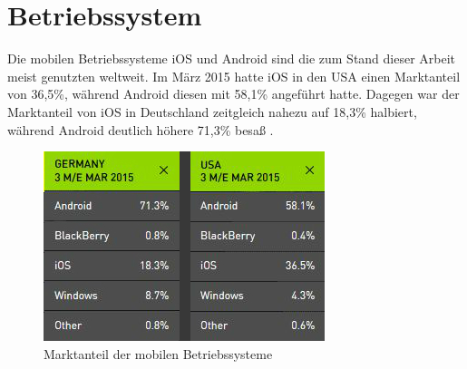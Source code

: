 \section{Betriebssystem}
	Die mobilen Betriebssysteme iOS und Android sind die zum Stand dieser Arbeit
	meist genutzten weltweit. Im März 2015 hatte iOS in den USA einen
	Marktanteil von 36,5\%, während Android diesen mit 58,1\% angeführt hatte.
	Dagegen war der Marktanteil von iOS in Deutschland zeitgleich nahezu auf 18,3\%
	halbiert, während Android deutlich höhere 71,3\% besaß \cite{MobileOsStat}.
	\begin{figure}[h]
		\centering
		\includegraphics[width=0.5\linewidth]{ios/media/marketshare-cmp-201503.jpg}
		\caption{Marktanteil der mobilen Betriebssysteme
		\cite{MobileOsStat}}
		\label{fig:marcetshare}
	\end{figure}